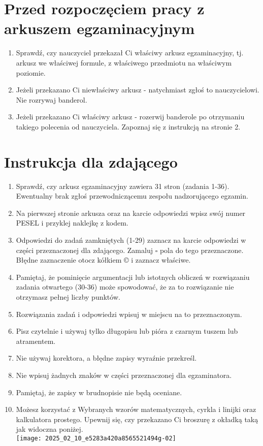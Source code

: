 \documentclass[10pt]{article}
\begin{document}
\section*{Przed rozpoczęciem pracy z arkuszem egzaminacyjnym}
\begin{enumerate}
  \item Sprawdź, czy nauczyciel przekazał Ci właściwy arkusz egzaminacyjny, tj. arkusz we właściwej formule, z właściwego przedmiotu na właściwym poziomie.
  \item Jeżeli przekazano Ci niewłaściwy arkusz - natychmiast zgłoś to nauczycielowi. Nie rozrywaj banderol.
  \item Jeżeli przekazano Ci właściwy arkusz - rozerwij banderole po otrzymaniu takiego polecenia od nauczyciela. Zapoznaj się z instrukcją na stronie 2.
\end{enumerate}

\section*{Instrukcja dla zdającego}
\begin{enumerate}
  \item Sprawdź, czy arkusz egzaminacyjny zawiera 31 stron (zadania 1-36). Ewentualny brak zgłoś przewodniczącemu zespołu nadzorującego egzamin.
  \item Na pierwszej stronie arkusza oraz na karcie odpowiedzi wpisz swój numer PESEL i przyklej naklejkę z kodem.
  \item Odpowiedzi do zadań zamkniętych (1-29) zaznacz na karcie odpowiedzi w części przeznaczonej dla zdającego. Zamaluj \(\square\) pola do tego przeznaczone. Błędne zaznaczenie otocz kółkiem © i zaznacz właściwe.
  \item Pamiętaj, że pominięcie argumentacji lub istotnych obliczeń w rozwiązaniu zadania otwartego (30-36) może spowodować, że za to rozwiązanie nie otrzymasz pełnej liczby punktów.
  \item Rozwiązania zadań i odpowiedzi wpisuj w miejscu na to przeznaczonym.
  \item Pisz czytelnie i używaj tylko długopisu lub pióra z czarnym tuszem lub atramentem.
  \item Nie używaj korektora, a błędne zapisy wyraźnie przekreśl.
  \item Nie wpisuj żadnych znaków w części przeznaczonej dla egzaminatora.
  \item Pamiętaj, że zapisy w brudnopisie nie będą oceniane.
  \item Możesz korzystać z Wybranych wzorów matematycznych, cyrkla i linijki oraz kalkulatora prostego. Upewnij się, czy przekazano Ci broszurę z okładką taką jak widoczna poniżej.\\
\texttt{[image: 2025\_02\_10\_e5283a420a8565521494g-02]}
\end{enumerate}
\end{document}
